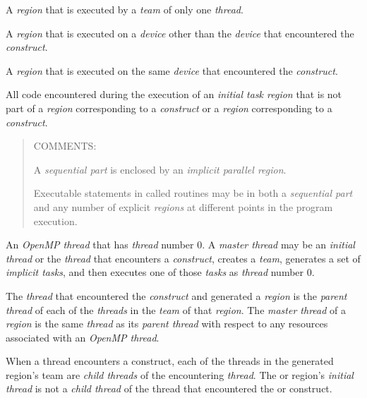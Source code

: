 \smallskip
{}
\glossarydefstart
A  \emph{region} that is executed by a \emph{team} of only one \emph{thread}.
\glossarydefend

\glossarydefstart
A  \emph{region} that is executed on a \emph{device} other than the \emph{device} that encountered the  \emph{construct}. 
\glossarydefend

\smallskip
{}
\glossarydefstart
A  \emph{region} that is executed on the same \emph{device} that encountered the  \emph{construct}.
\glossarydefend

\glossarydefstart
All code encountered during the execution of an \emph{initial task region} that is not part
of a  \emph{region} corresponding to a  \emph{construct} or a 
\emph{region} corresponding to a  \emph{construct}.

\begin{quote}
COMMENTS:

A \emph{sequential part} is enclosed by an \emph{implicit parallel region}.

Executable statements in called routines may be in both a \emph{sequential
part} and any number of explicit  \emph{regions} at different points
in the program execution.
\end{quote}
\glossarydefend

\glossarydefstart
An \emph{OpenMP thread} that has  \emph{thread} number 0. A \emph{master
thread} may be an \emph{initial thread} or the \emph{thread} that encounters a
 \emph{construct}, creates a \emph{team}, generates a set of
\emph{implicit tasks}, and then executes one of those \emph{tasks} as
\emph{thread} number 0.
\glossarydefend

\glossarydefstart
The \emph{thread} that encountered the  \emph{construct} and generated a
 \emph{region} is the \emph{parent thread} of each of the
\emph{threads} in the \emph{team} of that
 \emph{region}. The \emph{master thread}
of a  \emph{region} is the same \emph{thread}
as its \emph{parent thread} with respect to any resources associated with an \emph{OpenMP thread}.
\glossarydefend

\glossarydefstart
When a thread encounters a  construct, each of the threads in the
generated  region's team are \emph{child threads} of the encountering \emph{thread}.
The  or  region's \emph{initial thread} is not a \emph{child thread} of the thread
that encountered the  or  construct.
\glossarydefend

